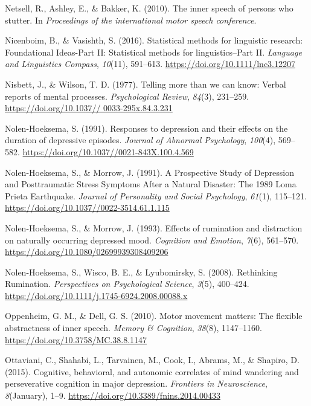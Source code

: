 \documentclass[a4paper,12pt,twoside,openright,oldfontcommands]{memoir}
\begin{document}
\hypertarget{ref-netsell_inner_2010}{}
Netsell, R., Ashley, E., \& Bakker, K. (2010). The inner speech of
persons who stutter. In \emph{Proceedings of the international motor
speech conference}.

\hypertarget{ref-nicenboim_statistical_2016}{}
Nicenboim, B., \& Vasishth, S. (2016). Statistical methods for
linguistic research: Foundational Ideas-Part II: Statistical methods for
linguistics--Part II. \emph{Language and Linguistics Compass},
\emph{10}(11), 591--613. \url{https://doi.org/10.1111/lnc3.12207}

\hypertarget{ref-nisbett_telling_1977}{}
Nisbett, J., \& Wilson, T. D. (1977). Telling more than we can know:
Verbal reports of mental processes. \emph{Psychological Review},
\emph{84}(3), 231--259.
\href{https://doi.org/10.1037//\%200033-295x.84.3.231}{https://doi.org/10.1037// 0033-295x.84.3.231}

\hypertarget{ref-nolen-hoeksema_responses_1991}{}
Nolen-Hoeksema, S. (1991). Responses to depression and their effects on
the duration of depressive episodes. \emph{Journal of Abnormal
Psychology}, \emph{100}(4), 569--582.
\url{https://doi.org/10.1037//0021-843X.100.4.569}

\hypertarget{ref-nolen-hoeksema_prospective_1991}{}
Nolen-Hoeksema, S., \& Morrow, J. (1991). A Prospective Study of
Depression and Posttraumatic Stress Symptoms After a Natural Disaster:
The 1989 Loma Prieta Earthquake. \emph{Journal of Personality and Social
Psychology}, \emph{61}(1), 115--121.
\url{https://doi.org/10.1037//0022-3514.61.1.115}

\hypertarget{ref-nolen-hoeksema_effects_1993}{}
Nolen-Hoeksema, S., \& Morrow, J. (1993). Effects of rumination and
distraction on naturally occurring depressed mood. \emph{Cognition and
Emotion}, \emph{7}(6), 561--570.
\url{https://doi.org/10.1080/02699939308409206}

\hypertarget{ref-Nolen-Hoeksema2008}{}
Nolen-Hoeksema, S., Wisco, B. E., \& Lyubomirsky, S. (2008). Rethinking
Rumination. \emph{Perspectives on Psychological Science}, \emph{3}(5),
400--424. \url{https://doi.org/10.1111/j.1745-6924.2008.00088.x}

\hypertarget{ref-oppenheim_motor_2010}{}
Oppenheim, G. M., \& Dell, G. S. (2010). Motor movement matters: The
flexible abstractness of inner speech. \emph{Memory \& Cognition},
\emph{38}(8), 1147--1160. \url{https://doi.org/10.3758/MC.38.8.1147}

\hypertarget{ref-Ottaviani2015}{}
Ottaviani, C., Shahabi, L., Tarvainen, M., Cook, I., Abrams, M., \&
Shapiro, D. (2015). Cognitive, behavioral, and autonomic correlates of
mind wandering and perseverative cognition in major depression.
\emph{Frontiers in Neuroscience}, \emph{8}(January), 1--9.
\url{https://doi.org/10.3389/fnins.2014.00433}
\end{document}
